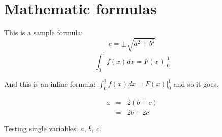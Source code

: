 
\section{Mathematic formulas}
This is a sample formula:
$$ c = \pm\sqrt{a^2 + b^2} $$
\begin{displaymath}
\int_0^1 f(x)dx = F(x)|_0^1
\end{displaymath}

And this is an inline formula: $\int_0^1 f(x)dx = F(x)|_0^1$ and
so it goes.

\begin{eqnarray}
  a &=& 2(b+c) \\
    &=& 2b + 2c
\end{eqnarray}

Testing single variables: $a$, $b$, $c$.
